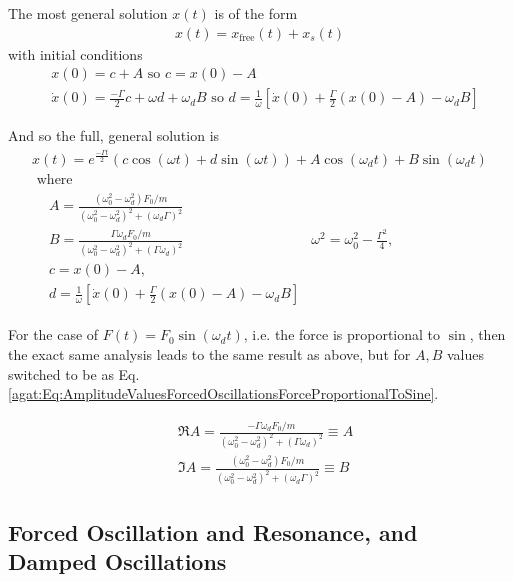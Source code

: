 The most general solution $x(t)$ is of the form
\[
\begin{gathered}
	x(t) = x_{\text{free}}(t) + x_s(t)
\end{gathered}
\]
with initial conditions
\[
\begin{aligned}
	& x(0) = c + A \text{ so } c = x(0) - A \\
	& \dot{x}(0) = \frac{-\Gamma}{2} c + \omega d + \omega_d B \text{ so } d = \frac{1}{\omega} \left[ \dot{x}(0) + \frac{\Gamma}{2} (x(0) - A) - \omega_d B \right]
\end{aligned}
\]

And so the full, general solution is 
\begin{equation}
	\begin{gathered}
		x(t) = e^{\frac{-\Gamma t}{2} } (c\cos{(\omega t)} + d \sin{ (\omega t)} ) + A \cos{ (\omega_d t)} + B \sin{(\omega_d t)} \\
		\text{ where } \\
		\begin{aligned}
			& A = \frac{ (\omega_0^2 - \omega_d^2) F_0 / m }{ (\omega_0^2 - \omega_d^2)^2 + (\omega_d \Gamma)^2 } \\
			& B = \frac{ \Gamma \omega_d F_0 / m }{ (\omega_0^2 - \omega_d^2)^2 + (\Gamma \omega_d)^2 }
			& \omega^2 = \omega_0^2 - \frac{\Gamma^2}{4}, \\
			& c = x(0) - A, \\
			& d = \frac{1}{\omega} \left[ \dot{x}(0) + \frac{\Gamma}{2} (x(0) - A) - \omega_d B \right]
		\end{aligned}
	\end{gathered}
\end{equation}

For the case of $F(t) = F_0 \sin{(\omega_d t)}$, i.e. the force is proportional to $\sin$, then the exact same analysis leads to the same result as above, but for $A,B$ values switched to be as Eq. \ref{agat:Eq:AmplitudeValuesForcedOscillationsForceProportionalToSine}.

\[
\begin{aligned}
	& \Re{A} = \frac{ -\Gamma \omega_d F_0 /m }{ (\omega_0^2 - \omega_d^2)^2 + (\Gamma \omega_d )^2 } \equiv A \\
	& \Im{A} = \frac{ (\omega_0^2 - \omega_d^2) F_0/m }{(\omega_0^2 - \omega_d^2)^2 + (\omega_d \Gamma)^2} \equiv B 
\end{aligned}
\]

\subsection{Forced Oscillation and Resonance, and Damped Oscillations}

